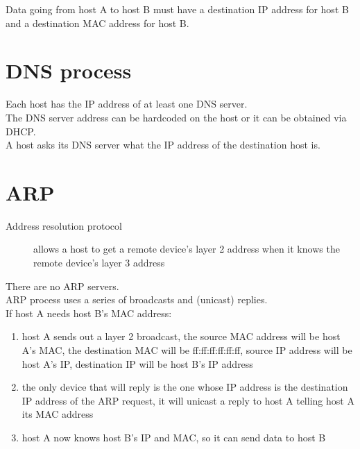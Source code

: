 \documentclass{article}
\begin{document}
Data going from host A to host B must have a destination IP address for host B
and a destination MAC address for host B.

\section{DNS process}

Each host has the IP address of at least one DNS server.\\

The DNS server address can be hardcoded on the host or it can be obtained
via DHCP.\\

A host asks its DNS server what the IP address of the destination host is.

\section{ARP}

\begin{description}

\item[Address resolution protocol]
allows a host to get a remote device's layer 2 address when it knows the
remote device's layer 3 address

\end{description}

There are no ARP servers.\\

ARP process uses a series of broadcasts and (unicast) replies.\\

If host A needs host B's MAC address:

\begin{enumerate}

\item host A sends out a layer 2 broadcast, the source MAC address will be
host A's MAC, the destination MAC will be ff:ff:ff:ff:ff:ff, source IP address
will be host A's IP, destination IP will be host B's IP address

\item the only device that will reply is the one whose IP address is the
destination IP address of the ARP request, it will unicast a reply to host A
telling host A its MAC address

\item host A now knows host B's IP and MAC, so it can send data to host B

\end{enumerate}
\end{document}
